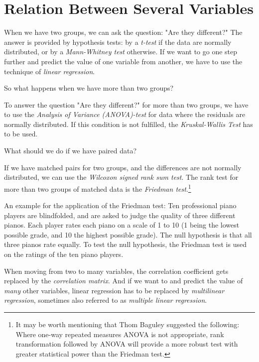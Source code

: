 \chapter{Relation Between Several Variables}

When we have two groups, we can ask the question: "Are they different?" The answer is provided by hypothesis tests: by a \emph{t-test} if the data are normally distributed, or by a \emph{Mann-Whitney test} otherwise. If we want to go one step further and predict the value of one variable from another, we have to use the technique of \emph{linear regression}.

So what happens when we have more than two groups?

To answer the question "Are they different?" for more than two groups, we have to use the \emph{Analysis of Variance (ANOVA)-test} for data where the residuals are normally distributed. If this condition is not fulfilled, the \emph{Kruskal-Wallis Test} has to be used.

What should we do if we have paired data?

If we have matched pairs for two groups, and the differences are not normally distributed, we can use the \emph{Wilcoxon signed rank sum test}. The rank test for more than two groups of matched data is the \emph{Friedman test}.\footnote{It may be worth mentioning that Thom Baguley suggested the following: Where one-way repeated measures ANOVA is not appropriate, rank transformation followed by ANOVA will provide a more robust test with greater statistical power than the Friedman test.}

An example for the application of the Friedman test: Ten professional piano players are blindfolded, and are asked to judge the quality of three different pianos. Each player rates each piano on a scale of 1 to 10 (1 being the lowest possible grade, and 10 the highest possible grade). The null hypothesis is that all three pianos rate equally. To test the null hypothesis, the Friedman test is used on the ratings of the ten piano players.

When moving from two to many variables, the correlation coefficient gets replaced by the \emph{correlation matrix}. And if we want to and predict the value of \emph{many} other variables, linear regression has to be replaced by \emph{multilinear regression}, sometimes also referred to as \emph{multiple linear regression}.

